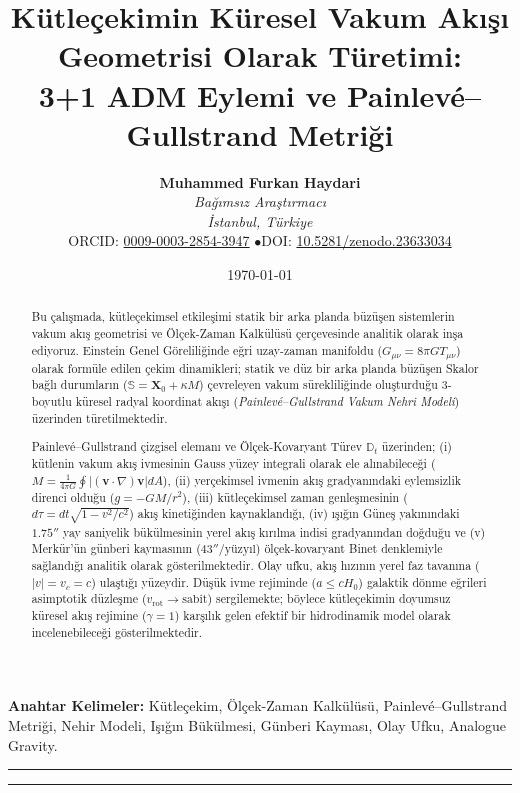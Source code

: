 \documentclass[11pt,a4paper]{article}
\title{\textbf{Kütleçekimin Küresel Vakum Akışı Geometrisi Olarak Türetimi: \\ 3+1 ADM Eylemi ve Painlev\'e--Gullstrand Metriği}}
\author{
    \textbf{Muhammed Furkan Haydari} \\
    \textit{Bağımsız Araştırmacı} \\
    \textit{İstanbul, Türkiye} \\
    \small ORCID: \href{https://orcid.org/0009-0003-2854-3947}{0009-0003-2854-3947} \quad$\bullet$\quad \small DOI: \href{https://doi.org/10.5281/zenodo.23633034}{10.5281/zenodo.23633034}
}
\date{\today}
\begin{document}
\maketitle

\begin{abstract}
    Bu çalışmada, kütleçekimsel etkileşimi statik bir arka planda büzüşen sistemlerin vakum akış geometrisi ve Ölçek-Zaman Kalkülüsü çerçevesinde analitik olarak inşa ediyoruz. Einstein Genel Göreliliğinde eğri uzay-zaman manifoldu ($G_{\mu\nu} = 8\pi G T_{\mu\nu}$) olarak formüle edilen çekim dinamikleri; statik ve düz bir arka planda büzüşen Skalor bağlı durumların ($\mathbb{S} = \mathbf{X}_0 + \kappa M$) çevreleyen vakum sürekliliğinde oluşturduğu 3-boyutlu küresel radyal koordinat akışı (\textit{Painlevé--Gullstrand Vakum Nehri Modeli}) üzerinden türetilmektedir.

    Painlev\'e--Gullstrand çizgisel elemanı ve Ölçek-Kovaryant Türev $\mathbb{D}_t$ üzerinden; (i) kütlenin vakum akış ivmesinin Gauss yüzey integrali olarak ele alınabileceği ($M = \frac{1}{4\pi G}\oint |(\mathbf{v}\cdot\nabla)\mathbf{v}| dA$), (ii) yerçekimsel ivmenin akış gradyanındaki eylemsizlik direnci olduğu ($g = -GM/r^2$), (iii) kütleçekimsel zaman genleşmesinin ($d\tau = dt\sqrt{1-v^2/c^2}$) akış kinetiğinden kaynaklandığı, (iv) ışığın Güneş yakınındaki $1.75''$ yay saniyelik bükülmesinin yerel akış kırılma indisi gradyanından doğduğu ve (v) Merkür'ün günberi kaymasının ($43''/\text{yüzyıl}$) ölçek-kovaryant Binet denklemiyle sağlandığı analitik olarak gösterilmektedir. Olay ufku, akış hızının yerel faz tavanına ($|v| = v_c = c$) ulaştığı yüzeydir. Düşük ivme rejiminde ($a \le c H_0$) galaktik dönme eğrileri asimptotik düzleşme ($v_{\mathrm{rot}} \to \text{sabit}$) sergilemekte; böylece kütleçekimin doyumsuz küresel akış rejimine ($\gamma = 1$) karşılık gelen efektif bir hidrodinamik model olarak incelenebileceği gösterilmektedir.
\end{abstract}

\vspace{1em}
\noindent\textbf{Anahtar Kelimeler:} Kütleçekim, Ölçek-Zaman Kalkülüsü, Painlev\'e--Gullstrand Metriği, Nehir Modeli, Işığın Bükülmesi, Günberi Kayması, Olay Ufku, Analogue Gravity.

\vspace{1em}
\hrule
\vspace{0.8em}
\tableofcontents
\vspace{0.8em}
\hrule
\vspace{1.5em}
\end{document}
